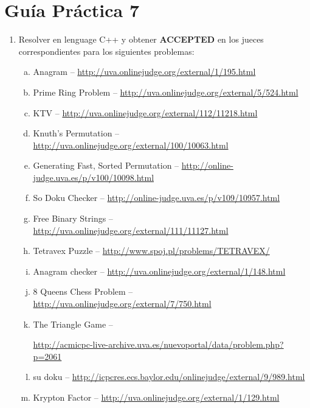 




\section*{Gu\'ia Pr\'actica 7}

\begin{enumerate}[1 -]
	
	\item Resolver en lenguage C++ y obtener \textbf{ACCEPTED} en los jueces correspondientes para los siguientes problemas:
	
	\begin{enumerate}[a)]
		\item Anagram -- \href{http://uva.onlinejudge.org/external/1/195.html}{http://uva.onlinejudge.org/external/1/195.html}
		\item Prime Ring Problem -- \href{http://uva.onlinejudge.org/external/5/524.html}{http://uva.onlinejudge.org/external/5/524.html}
		\item KTV -- \href{http://uva.onlinejudge.org/external/112/11218.html}{http://uva.onlinejudge.org/external/112/11218.html}
		\item Knuth’s Permutation -- \href{http://uva.onlinejudge.org/external/100/10063.html}{http://uva.onlinejudge.org/external/100/10063.html}
		\item Generating Fast, Sorted Permutation -- \href{http://online-judge.uva.es/p/v100/10098.html}{http://online-judge.uva.es/p/v100/10098.html}
		\item So Doku Checker -- \href{http://online-judge.uva.es/p/v109/10957.html}{http://online-judge.uva.es/p/v109/10957.html}
		\item Free Binary Strings -- \href{http://uva.onlinejudge.org/external/111/11127.html}{http://uva.onlinejudge.org/external/111/11127.html}
		\item Tetravex Puzzle -- \href{http://www.spoj.pl/problems/TETRAVEX/}{http://www.spoj.pl/problems/TETRAVEX/}
		\item Anagram checker -- \href{http://uva.onlinejudge.org/external/1/148.html}{http://uva.onlinejudge.org/external/1/148.html}
		\item 8 Queens Chess Problem  -- \href{http://uva.onlinejudge.org/external/7/750.html}{http://uva.onlinejudge.org/external/7/750.html}
		\item The Triangle Game -- 

			\href{http://acmicpc-live-archive.uva.es/nuevoportal/data/problem.php?p=2061}{http://acmicpc-live-archive.uva.es/nuevoportal/data/problem.php?p=2061}
		\item su doku -- \href{http://icpcres.ecs.baylor.edu/onlinejudge/external/9/989.html}{http://icpcres.ecs.baylor.edu/onlinejudge/external/9/989.html}
		\item Krypton Factor -- \href{http://uva.onlinejudge.org/external/1/129.html}{http://uva.onlinejudge.org/external/1/129.html}
	\end{enumerate}

\end{enumerate}






